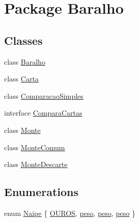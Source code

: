 \hypertarget{namespace_baralho}{
\section{\-Package \-Baralho}
\label{namespace_baralho}
}
\subsection*{\-Classes}
\begin{DoxyCompactItemize}
\item 
class \hyperlink{class_baralho_1_1_baralho}{\-Baralho}
\item 
class \hyperlink{class_baralho_1_1_carta}{\-Carta}
\item 
class \hyperlink{class_baralho_1_1_comparacao_simples}{\-Comparacao\-Simples}
\item 
interface \hyperlink{interface_baralho_1_1_compara_cartas}{\-Compara\-Cartas}
\item 
class \hyperlink{class_baralho_1_1_monte}{\-Monte}
\item 
class \hyperlink{class_baralho_1_1_monte_comum}{\-Monte\-Comum}
\item 
class \hyperlink{class_baralho_1_1_monte_descarte}{\-Monte\-Descarte}
\end{DoxyCompactItemize}
\subsection*{\-Enumerations}
\begin{DoxyCompactItemize}
\item 
enum \hyperlink{namespace_baralho_ab887857dcb81ef6672322ce80039b905}{\-Naipe} \{ \hyperlink{namespace_baralho_ab887857dcb81ef6672322ce80039b905}{\-O\-U\-R\-O\-S}, 
\hyperlink{namespace_baralho_ab887857dcb81ef6672322ce80039b905}{peso}, 
\hyperlink{namespace_baralho_ab887857dcb81ef6672322ce80039b905}{peso}, 
\hyperlink{namespace_baralho_ab887857dcb81ef6672322ce80039b905}{peso}
 \}
\end{DoxyCompactItemize}


